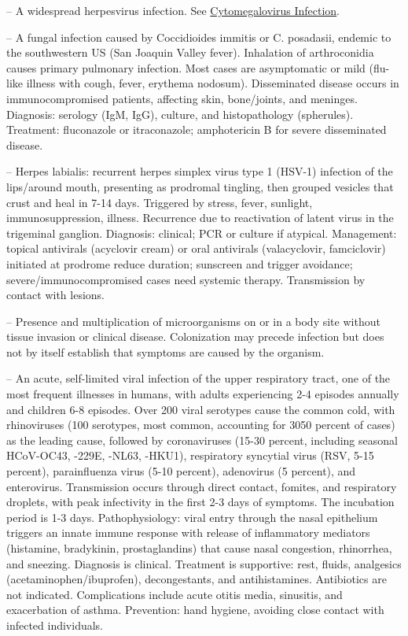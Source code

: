 -- A widespread herpesvirus infection. See \hyperlink{Cytomegalovirus Infection}{Cytomegalovirus Infection}.

-- A fungal infection caused by Coccidioides immitis or C. posadasii, endemic to the southwestern US (San Joaquin Valley fever). Inhalation of arthroconidia causes primary pulmonary infection. Most cases are asymptomatic or mild (flu-like illness with cough, fever, erythema nodosum). Disseminated disease occurs in immunocompromised patients, affecting skin, bone/joints, and meninges. Diagnosis: serology (IgM, IgG), culture, and histopathology (spherules). Treatment: fluconazole or itraconazole; amphotericin B for severe disseminated disease.

-- Herpes labialis: recurrent herpes simplex virus type 1 (HSV-1) infection of the lips/around mouth, presenting as prodromal tingling, then grouped vesicles that crust and heal in 7-14 days. Triggered by stress, fever, sunlight, immunosuppression, illness. Recurrence due to reactivation of latent virus in the trigeminal ganglion. Diagnosis: clinical; PCR or culture if atypical. Management: topical antivirals (acyclovir cream) or oral antivirals (valacyclovir, famciclovir) initiated at prodrome reduce duration; sunscreen and trigger avoidance; severe/immunocompromised cases need systemic therapy. Transmission by contact with lesions.

-- Presence and multiplication of microorganisms on or in a body site without tissue invasion or clinical disease. Colonization may precede infection but does not by itself establish that symptoms are caused by the organism.

-- An acute, self-limited viral infection of the upper respiratory tract, one of the most frequent illnesses in humans, with adults experiencing 2-4 episodes annually and children 6-8 episodes. Over 200 viral serotypes cause the common cold, with rhinoviruses (100 serotypes, most common, accounting for 3050 percent of cases) as the leading cause, followed by coronaviruses (15-30 percent, including seasonal HCoV-OC43, -229E, -NL63, -HKU1), respiratory syncytial virus (RSV, 5-15 percent), parainfluenza virus (5-10 percent), adenovirus (5 percent), and enterovirus. Transmission occurs through direct contact, fomites, and respiratory droplets, with peak infectivity in the first 2-3 days of symptoms. The incubation period is 1-3 days. Pathophysiology: viral entry through the nasal epithelium triggers an innate immune response with release of inflammatory mediators (histamine, bradykinin, prostaglandins) that cause nasal congestion, rhinorrhea, and sneezing. Diagnosis is clinical. Treatment is supportive: rest, fluids, analgesics (acetaminophen/ibuprofen), decongestants, and antihistamines. Antibiotics are not indicated. Complications include acute otitis media, sinusitis, and exacerbation of asthma. Prevention: hand hygiene, avoiding close contact with infected individuals.

